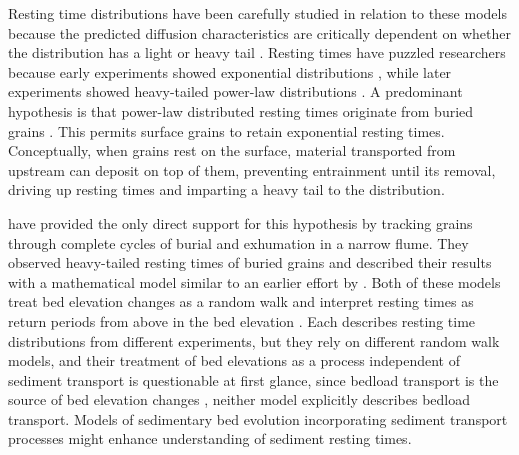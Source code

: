 Resting time distributions have been carefully studied in relation to these models because the predicted diffusion characteristics are critically dependent on whether the distribution has a light or heavy tail \citep{Bradley2017,Martin2012,Weeks1998}.
Resting times have puzzled researchers because early experiments showed exponential distributions \DIFdelbegin {}\DIFdelend \DIFaddbegin {}\DIFaddend , while later experiments showed heavy-tailed power-law distributions \citep{Martin2012,Voepel2013, Olinde2015, Pretzlav2016a, Bradley2017, Liu2019}.
A predominant hypothesis is that power-law distributed resting times originate from buried grains \citep{Martin2014,Voepel2013}. This permits surface grains to retain exponential resting times. 
Conceptually, when grains rest on the surface, material transported from upstream can deposit on top of them, preventing entrainment until its removal, driving up resting times and imparting a heavy tail to the distribution.

\citet{Martin2014} have provided the only direct support for this hypothesis by tracking grains through complete cycles of burial and exhumation in a narrow flume.
They observed heavy-tailed resting times of buried grains and described their results with a mathematical model similar to an earlier effort by \citet{Voepel2013}.
Both of these models treat bed elevation changes as a random walk and interpret resting times as return periods from above in the bed elevation \DIFdelbegin {}\DIFdelend \DIFaddbegin {}\DIFaddend \citep{Redner2007}.
Each describes resting time distributions from different experiments, but they rely on different random walk models, and their treatment of bed elevations as a process independent of sediment transport is questionable at first glance, since bedload transport is the source of bed elevation changes \citep{Wong2007}, \DIFdelbegin {}\DIFdelend \DIFaddbegin {}\DIFaddend neither model explicitly describes bedload transport.
Models of sedimentary bed evolution incorporating sediment transport processes might enhance understanding of sediment resting times.


